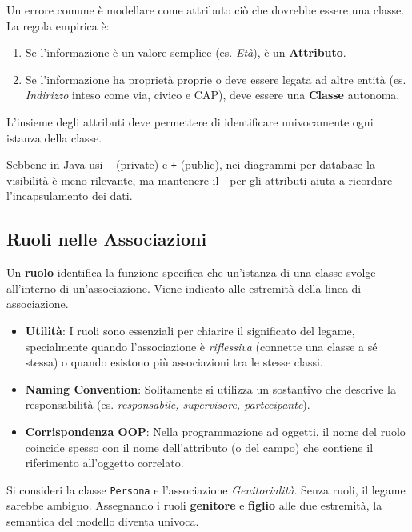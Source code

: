 Un errore comune è modellare come attributo ciò che dovrebbe essere una classe. La regola empirica è:
\begin{enumerate}
    \item Se l'informazione è un valore semplice (es. \textit{Età}), è un \textbf{Attributo}.
    \item Se l'informazione ha proprietà proprie o deve essere legata ad altre entità (es. \textit{Indirizzo} inteso come via, civico e CAP), deve essere una \textbf{Classe} autonoma.
\end{enumerate}

\begin{warningbox}[]
    L'insieme degli attributi deve permettere di identificare univocamente ogni istanza della classe.
\end{warningbox}

\begin{observation}
    Sebbene in Java usi \texttt{-} (private) e \texttt{+} (public), nei diagrammi per database la visibilità è meno rilevante, ma mantenere il - per gli attributi aiuta a ricordare l'incapsulamento dei dati.
\end{observation}

\subsection{Ruoli nelle Associazioni}

Un \textbf{ruolo} identifica la funzione specifica che un'istanza di una classe svolge all'interno di un'associazione. Viene indicato alle estremità della linea di associazione.

\begin{itemize}
    \item \textbf{Utilità}: I ruoli sono essenziali per chiarire il significato del legame, specialmente quando l'associazione è \textit{riflessiva} (connette una classe a sé stessa) o quando esistono più associazioni tra le stesse classi.
    \item \textbf{Naming Convention}: Solitamente si utilizza un sostantivo che descrive la responsabilità (es. \textit{responsabile, supervisore, partecipante}).
    \item \textbf{Corrispondenza OOP}: Nella programmazione ad oggetti, il nome del ruolo coincide spesso con il nome dell'attributo (o del campo) che contiene il riferimento all'oggetto correlato.
\end{itemize}

\begin{example}
    Si consideri la classe \texttt{Persona} e l'associazione \textit{Genitorialità}. Senza ruoli, il legame sarebbe ambiguo. Assegnando i ruoli \textbf{genitore} e \textbf{figlio} alle due estremità, la semantica del modello diventa univoca.
\end{example}

